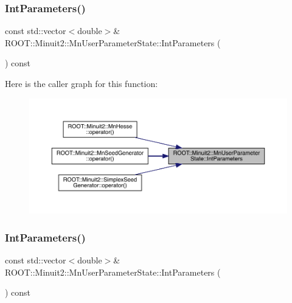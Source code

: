 \mbox{\label{classROOT_1_1Minuit2_1_1MnUserParameterState_a090cbf6f0d6efe452e90e4d9c4425d94}} 
\subsubsection{\texorpdfstring{IntParameters()}{IntParameters()}\hspace{0.1cm}{\footnotesize\ttfamily [1/3]}}
{\footnotesize\ttfamily const std\+::vector$<$double$>$\& R\+O\+O\+T\+::\+Minuit2\+::\+Mn\+User\+Parameter\+State\+::\+Int\+Parameters (\begin{DoxyParamCaption}{ }\end{DoxyParamCaption}) const\hspace{0.3cm}{\ttfamily [inline]}}

Here is the caller graph for this function\+:
\nopagebreak
\begin{figure}[H]
\begin{center}
\leavevmode
\includegraphics[width=350pt]{d3/de0/classROOT_1_1Minuit2_1_1MnUserParameterState_a090cbf6f0d6efe452e90e4d9c4425d94_icgraph}
\end{center}
\end{figure}
\mbox{\label{classROOT_1_1Minuit2_1_1MnUserParameterState_a090cbf6f0d6efe452e90e4d9c4425d94}} 
\subsubsection{\texorpdfstring{IntParameters()}{IntParameters()}\hspace{0.1cm}{\footnotesize\ttfamily [2/3]}}
{\footnotesize\ttfamily const std\+::vector$<$double$>$\& R\+O\+O\+T\+::\+Minuit2\+::\+Mn\+User\+Parameter\+State\+::\+Int\+Parameters (\begin{DoxyParamCaption}{ }\end{DoxyParamCaption}) const\hspace{0.3cm}{\ttfamily [inline]}}


